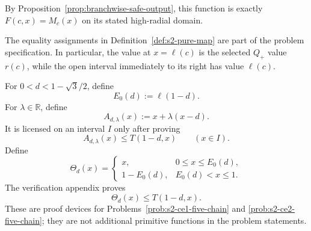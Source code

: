 By Proposition~\ref{prop:branchwise-safe-output}, this function is exactly
$F(c,x)=M_c(x)$ on its stated high-radial domain.

The equality assignments in Definition~\ref{def:s2-pure-map} are part of the
problem specification.  In particular, the value at \(x=\ell(c)\) is the
selected \(Q_+\) value \(r(c)\), while the open interval immediately to its
right has value \(\ell(c)\).

\begin{definition}
\label{def:s2-pure-relaxations}
For \(0<d<1-\sqrt3/2\), define
\[
 E_0(d):=\ell(1-d).
\]
For \(\lambda\in\mathbb R\), define
\[
 A_{d,\lambda}(x):=x+\lambda(x-d).
\]
It is licensed on an interval \(I\) only after proving
\[
 A_{d,\lambda}(x)\le T(1-d,x)
 \qquad(x\in I).
\]
Define
\[
 \Theta_d(x)=
 \begin{cases}
 x,&0\le x\le E_0(d),\\
 1-E_0(d),&E_0(d)<x\le1.
 \end{cases}
\]
The verification appendix proves
\[
 \Theta_d(x)\le T(1-d,x).
\]
These are proof devices for Problems~\ref{prob:s2-ce1-five-chain} and
\ref{prob:s2-ce2-five-chain}; they are not additional primitive functions in
the problem statements.
\end{definition}

